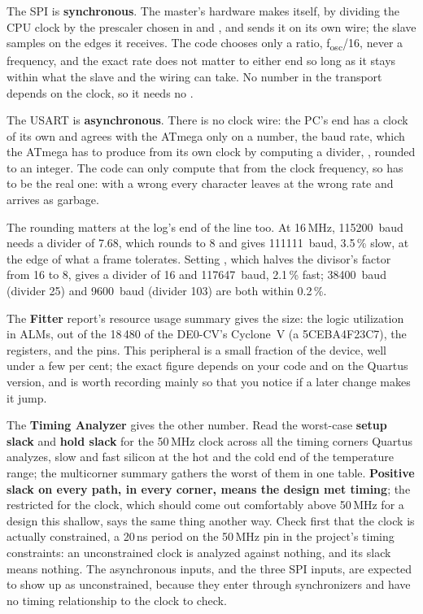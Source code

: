  The SPI is \textbf{synchronous}. The master's hardware makes  itself, by dividing
the CPU clock by the prescaler chosen in  and , and sends it on its own wire;
the slave samples on the edges it receives. The code chooses only a ratio, f\textsubscript{osc}/16,
never a frequency, and the exact rate does not matter to either end so long as it stays within what
the slave and the wiring can take. No number in the transport depends on the clock, so it needs no
.

The USART is \textbf{asynchronous}. There is no clock wire: the PC's end has a clock of its own and
agrees with the ATmega only on a number, the baud rate, which the ATmega has to produce from its own
clock by computing a divider, , rounded to an integer. The code
can only compute that from the clock frequency, so  has to be the real one: with a wrong
 every character leaves at the wrong rate and arrives as garbage.

The rounding matters at the log's end of the line too. At 16\,MHz, 115200~baud needs a divider of
7.68, which rounds to 8 and gives 111111~baud, 3.5\,\% slow, at the edge of what a frame tolerates.
Setting , which halves the divisor's factor from 16 to 8, gives a divider of 16 and
117647~baud, 2.1\,\% fast; 38400~baud (divider 25) and 9600~baud (divider 103) are both within
0.2\,\%.

 The \textbf{Fitter} report's resource usage summary gives the size: the logic utilization
in ALMs, out of the 18\,480 of the DE0-CV's Cyclone~V (a 5CEBA4F23C7), the registers, and the pins.
This peripheral is a small fraction of the device, well under a few per cent; the exact figure
depends on your code and on the Quartus version, and is worth recording mainly so that you notice
if a later change makes it jump.

The \textbf{Timing Analyzer} gives the other number. Read the worst-case \textbf{setup slack} and
\textbf{hold slack} for the 50\,MHz clock across all the timing corners Quartus analyzes, slow and
fast silicon at the hot and the cold end of the temperature range; the multicorner summary gathers
the worst of them in one table. \textbf{Positive slack on every path, in every corner, means the
design met timing}; the restricted  for the clock, which should come out comfortably
above 50\,MHz for a design this shallow, says the same thing another way. Check first that the
clock is actually constrained, a 20\,ns period on the 50\,MHz pin in the project's timing
constraints: an unconstrained clock is analyzed against nothing, and its slack means nothing. The
asynchronous inputs,  and the three SPI inputs, are expected to show up as unconstrained,
because they enter through synchronizers and have no timing relationship to the clock to check.

